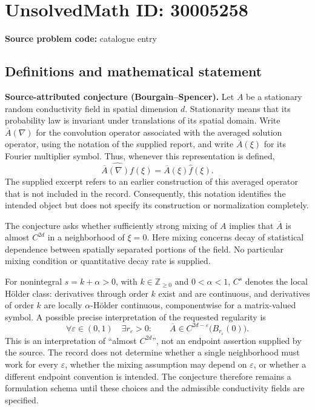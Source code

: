 \documentclass[11pt]{article}
\newcommand{\Z}{\mathbb{Z}}
\begin{document}
\section*{UnsolvedMath ID: 30005258}
\textbf{Source problem code:} catalogue entry
\subsection{Definitions and mathematical statement}
\textbf{Source-attributed conjecture (Bourgain--Spencer).} Let \(A\) be a stationary random conductivity field in spatial dimension \(d\). Stationarity means that its probability law is invariant under translations of its spatial domain. Write \(\overline A(\nabla)\) for the convolution operator associated with the averaged solution operator, using the notation of the supplied report, and write \(\overline A(\xi)\) for its Fourier multiplier symbol. Thus, whenever this representation is defined,
\[
\widehat{\overline A(\nabla)f}(\xi)
 =\overline A(\xi)\widehat f(\xi).
\]
The supplied excerpt refers to an earlier construction of this averaged operator that is not included in the record. Consequently, this notation identifies the intended object but does not specify its construction or normalization completely.

The conjecture asks whether sufficiently strong mixing of \(A\) implies that \(\overline A\) is almost \(C^{2d}\) in a neighborhood of \(\xi=0\). Here mixing concerns decay of statistical dependence between spatially separated portions of the field. No particular mixing condition or quantitative decay rate is supplied.

For nonintegral \(s=k+\alpha>0\), with \(k\in\Z_{\geq0}\) and \(0<\alpha<1\), \(C^s\) denotes the local H\"older class: derivatives through order \(k\) exist and are continuous, and derivatives of order \(k\) are locally \(\alpha\)-H\"older continuous, componentwise for a matrix-valued symbol. A possible precise interpretation of the requested regularity is
\[
\forall\varepsilon\in(0,1)\quad
\exists r_\varepsilon>0:\qquad
\overline A\in C^{2d-\varepsilon}
       \bigl(B_{r_\varepsilon}(0)\bigr).
\]
This is an interpretation of ``almost \(C^{2d}\)'', not an endpoint assertion supplied by the source. The record does not determine whether a single neighborhood must work for every \(\varepsilon\), whether the mixing assumption may depend on \(\varepsilon\), or whether a different endpoint convention is intended. The conjecture therefore remains a formulation schema until these choices and the admissible conductivity fields are specified.
\end{document}
